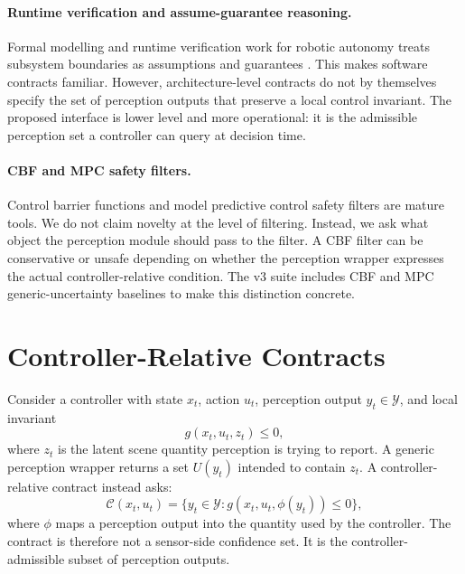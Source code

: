 \documentclass{article}
\newcommand{\x}{x}
\newcommand{\uvec}{u}
\newcommand{\contract}{\mathcal{C}}
\newcommand{\percepts}{\mathcal{Y}}
\begin{document}
\paragraph{Runtime verification and assume-guarantee reasoning.}
Formal modelling and runtime verification work for robotic autonomy treats subsystem boundaries as assumptions and guarantees \citep{farrell2021formal}. This makes software contracts familiar. However, architecture-level contracts do not by themselves specify the set of perception outputs that preserve a local control invariant. The proposed interface is lower level and more operational: it is the admissible perception set a controller can query at decision time.

\paragraph{CBF and MPC safety filters.}
Control barrier functions and model predictive control safety filters are mature tools. We do not claim novelty at the level of filtering. Instead, we ask what object the perception module should pass to the filter. A CBF filter can be conservative or unsafe depending on whether the perception wrapper expresses the actual controller-relative condition. The v3 suite includes CBF and MPC generic-uncertainty baselines to make this distinction concrete.

\section{Controller-Relative Contracts}

Consider a controller with state $\x_t$, action $\uvec_t$, perception output $y_t\in\percepts$, and local invariant
\begin{equation}
    g(\x_t,\uvec_t,z_t)\leq 0,
    \label{eq:invariant}
\end{equation}
where $z_t$ is the latent scene quantity perception is trying to report. A generic perception wrapper returns a set $U(y_t)$ intended to contain $z_t$. A controller-relative contract instead asks:
\begin{equation}
    \contract(\x_t,\uvec_t)
    =
    \{y_t\in\percepts:
    g(\x_t,\uvec_t,\phi(y_t))\leq 0\},
    \label{eq:contract}
\end{equation}
where $\phi$ maps a perception output into the quantity used by the controller. The contract is therefore not a sensor-side confidence set. It is the controller-admissible subset of perception outputs.
\end{document}
